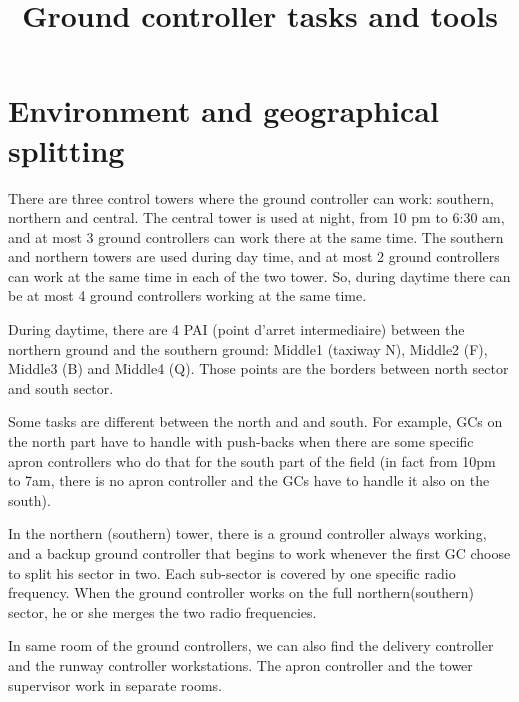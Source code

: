 \documentclass{article}
\begin{document}
	\title{Ground controller tasks and tools}
	\maketitle


\section{Environment and geographical splitting}

There are three control towers where the ground controller can work: southern, northern and central. The central tower is used at night, from 10 pm to 6:30 am, and at most 3 ground controllers can work there at the same time. The southern and northern towers are used during day time, and at most 2 ground controllers can work at the same time in each of the two tower. So, during daytime there can be at most 4 ground controllers working at the same time.

During daytime, there are 4 PAI (point d'arret intermediaire) between the northern ground and the southern ground: Middle1 (taxiway N), Middle2 (F), Middle3 (B) and Middle4 (Q). Those points are the borders between north sector and south sector.

Some tasks are different between the north and and south. For example, GCs on the north part have to handle with push-backs when there are some specific apron controllers who do that for the south part of the field (in fact from 10pm to 7am, there is no apron controller and the GCs have to handle it also on the south). 

In the northern (southern) tower, there is a ground controller always working, and a backup ground controller that begins to work whenever the first GC choose to split his sector in two. Each sub-sector is covered by one specific radio frequency. When the ground controller works on the full northern(southern) sector, he or she merges the two radio frequencies.

In same room of the ground controllers, we can also find the delivery controller and the runway controller workstations. The apron controller and the tower supervisor work in separate rooms.
\end{document}
